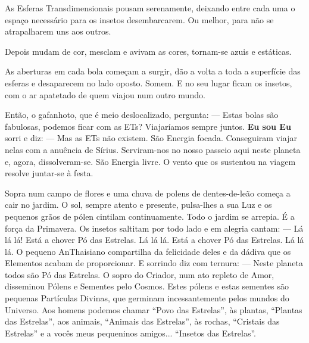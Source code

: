 As Esferas Transdimensionais pousam serenamente, deixando entre cada uma o espaço necessário para os insetos desembarcarem. Ou melhor, para não se atrapalharem uns aos outros.

Depois mudam de cor, mesclam e avivam as cores, tornam-se azuis e estáticas.

As aberturas em cada bola começam a surgir, dão a volta a toda a superfície das esferas e desaparecem no lado oposto. Somem. E no seu lugar ficam os insetos, com o ar apatetado de quem viajou num outro mundo.

Então, o gafanhoto, que é meio deslocalizado, pergunta:
\bigbreak
— Estas bolas são fabulosas, podemos ficar com as ETs? Viajaríamos sempre juntos.
\bigbreak
\textbf{Eu sou Eu} sorri e diz:
\bigbreak
— Mas as ETs não existem. São Energia focada. Conseguiram viajar nelas com a anuência de Sírius. Serviram-nos no nosso passeio aqui neste planeta e, agora, dissolveram-se. São Energia livre.
\bigbreak
O vento que os sustentou na viagem resolve juntar-se à festa.

Sopra num campo de flores e uma chuva de polens de dentes-de-leão começa a cair no jardim. O sol, sempre atento e presente, pulsa-lhes a sua Luz e os pequenos grãos de pólen cintilam continuamente. Todo o jardim se arrepia.
\bigbreak
É a força da Primavera.
\bigbreak
Os insetos saltitam por todo lado e em alegria cantam:
\bigbreak
— Lá lá lá! Está a chover Pó das Estrelas. Lá lá lá. Está a chover Pó das Estrelas. Lá lá lá.
\bigbreak
O pequeno AnThaisiano compartilha da felicidade deles e da dádiva que os Elementos acabam de proporcionar. E sorrindo diz com ternura:
\bigbreak
— Neste planeta todos são Pó das Estrelas. O sopro do Criador, num ato repleto de Amor, disseminou Pólens e Sementes pelo Cosmos. Estes pólens e estas sementes são pequenas Partículas Divinas, que germinam incessantemente pelos mundos do Universo. Aos homens podemos chamar “Povo das Estrelas”, às plantas, “Plantas das Estrelas”, aos animais, “Animais das Estrelas”, às rochas, “Cristais das Estrelas” e a vocês meus pequeninos amigos... “Insetos das Estrelas”.

